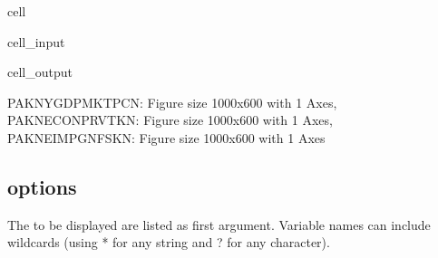 \documentclass[letterpaper,10pt,english]{jupyterBook}
\begin{document}
\begin{sphinxuseclass}{cell}\begin{sphinxVerbatimInput}

\begin{sphinxuseclass}{cell_input}
\begin{sphinxVerbatim}[commandchars=\\\{\}]
  
\end{sphinxVerbatim}

\end{sphinxuseclass}\end{sphinxVerbatimInput}
\begin{sphinxVerbatimOutput}

\begin{sphinxuseclass}{cell_output}
\begin{sphinxVerbatim}[commandchars=\\\{\}]
\PYGZob{}\PYGZsq{}PAKNYGDPMKTPCN\PYGZsq{}: \PYGZlt{}Figure size 1000x600 with 1 Axes\PYGZgt{},
 \PYGZsq{}PAKNECONPRVTKN\PYGZsq{}: \PYGZlt{}Figure size 1000x600 with 1 Axes\PYGZgt{},
 \PYGZsq{}PAKNEIMPGNFSKN\PYGZsq{}: \PYGZlt{}Figure size 1000x600 with 1 Axes\PYGZgt{}\PYGZcb{}
\end{sphinxVerbatim}

\end{sphinxuseclass}\end{sphinxVerbatimOutput}

\end{sphinxuseclass}

\subsection{ options}
\label{\detokenize{content/06_WBModels/ScenarioAnalysis:keep-plot-options}}
\sphinxAtStartPar
The  to be displayed are listed as first argument. Variable names can include
wildcards (using * for any string and ? for any character).

\sphinxAtStartPar
{}
\end{document}
